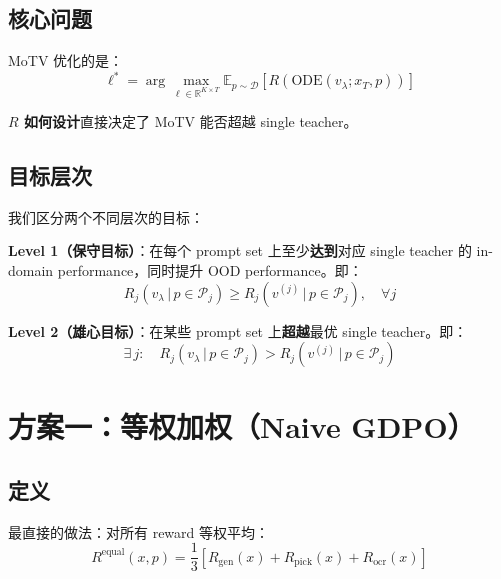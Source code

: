 \documentclass[11pt,a4paper]{article}
\newcommand{\E}{\mathbb{E}}
\newcommand{\R}{\mathbb{R}}
\newcommand{\reward}{R}
\theoremstyle{definition}
\begin{document}
\subsection{核心问题}

MoTV 优化的是：
\begin{equation}
\ell^* = \arg\max_{\ell \in \R^{K \times T}} \E_{p \sim \mathcal{D}}\left[\reward\!\left(\mathrm{ODE}(v_\lambda; x_T, p)\right)\right]
\end{equation}

\textbf{$\reward$ 如何设计}直接决定了 MoTV 能否超越 single teacher。

\subsection{目标层次}

我们区分两个不同层次的目标：

\begin{tcolorbox}[colback=blue!5, colframe=blue!40]
\textbf{Level 1（保守目标）}：在每个 prompt set 上至少\textbf{达到}对应 single teacher 的 in-domain performance，同时提升 OOD performance。即：
\begin{equation}
R_j(v_\lambda \,|\, p \in \mathcal{P}_j) \geq R_j(v^{(j)} \,|\, p \in \mathcal{P}_j), \quad \forall j
\end{equation}

\textbf{Level 2（雄心目标）}：在某些 prompt set 上\textbf{超越}最优 single teacher。即：
\begin{equation}
\exists\, j: \quad R_j(v_\lambda \,|\, p \in \mathcal{P}_j) > R_j(v^{(j)} \,|\, p \in \mathcal{P}_j)
\end{equation}
\end{tcolorbox}

\section{方案一：等权加权（Naive GDPO）}
\label{sec:equal_weight}

\subsection{定义}

最直接的做法：对所有 reward 等权平均：
\begin{equation}
\reward^{\mathrm{equal}}(x, p) = \frac{1}{3}\left[R_{\mathrm{gen}}(x) + R_{\mathrm{pick}}(x) + R_{\mathrm{ocr}}(x)\right]
\label{eq:equal_reward}
\end{equation}
\end{document}
